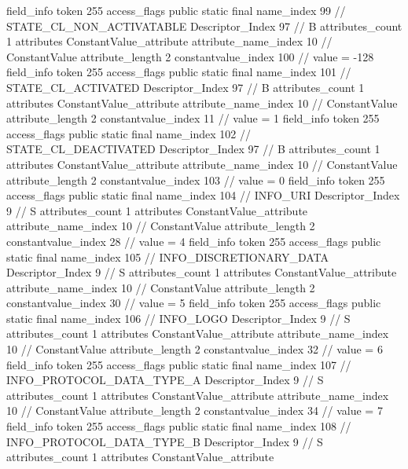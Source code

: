 {{{{{{{				}
				}
			}
			field_info {
				token	255
				access_flags	public static final
				name_index	99		// STATE_CL_NON_ACTIVATABLE
				Descriptor_Index	97		// B
				attributes_count	1
				attributes {
				ConstantValue_attribute {
					attribute_name_index	10		// ConstantValue
					attribute_length	2
					constantvalue_index	100		// value = -128
				}
				}
			}
			field_info {
				token	255
				access_flags	public static final
				name_index	101		// STATE_CL_ACTIVATED
				Descriptor_Index	97		// B
				attributes_count	1
				attributes {
				ConstantValue_attribute {
					attribute_name_index	10		// ConstantValue
					attribute_length	2
					constantvalue_index	11		// value = 1
				}
				}
			}
			field_info {
				token	255
				access_flags	public static final
				name_index	102		// STATE_CL_DEACTIVATED
				Descriptor_Index	97		// B
				attributes_count	1
				attributes {
				ConstantValue_attribute {
					attribute_name_index	10		// ConstantValue
					attribute_length	2
					constantvalue_index	103		// value = 0
				}
				}
			}
			field_info {
				token	255
				access_flags	public static final
				name_index	104		// INFO_URI
				Descriptor_Index	9		// S
				attributes_count	1
				attributes {
				ConstantValue_attribute {
					attribute_name_index	10		// ConstantValue
					attribute_length	2
					constantvalue_index	28		// value = 4
				}
				}
			}
			field_info {
				token	255
				access_flags	public static final
				name_index	105		// INFO_DISCRETIONARY_DATA
				Descriptor_Index	9		// S
				attributes_count	1
				attributes {
				ConstantValue_attribute {
					attribute_name_index	10		// ConstantValue
					attribute_length	2
					constantvalue_index	30		// value = 5
				}
				}
			}
			field_info {
				token	255
				access_flags	public static final
				name_index	106		// INFO_LOGO
				Descriptor_Index	9		// S
				attributes_count	1
				attributes {
				ConstantValue_attribute {
					attribute_name_index	10		// ConstantValue
					attribute_length	2
					constantvalue_index	32		// value = 6
				}
				}
			}
			field_info {
				token	255
				access_flags	public static final
				name_index	107		// INFO_PROTOCOL_DATA_TYPE_A
				Descriptor_Index	9		// S
				attributes_count	1
				attributes {
				ConstantValue_attribute {
					attribute_name_index	10		// ConstantValue
					attribute_length	2
					constantvalue_index	34		// value = 7
				}
				}
			}
			field_info {
				token	255
				access_flags	public static final
				name_index	108		// INFO_PROTOCOL_DATA_TYPE_B
				Descriptor_Index	9		// S
				attributes_count	1
				attributes {
				ConstantValue_attribute {
}}}}}}}
